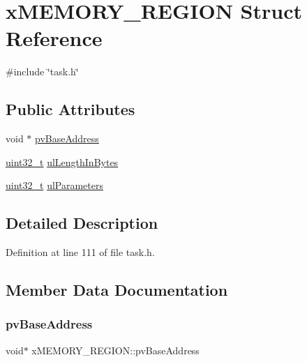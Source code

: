\hypertarget{structxMEMORY__REGION}{}\section{x\+M\+E\+M\+O\+R\+Y\+\_\+\+R\+E\+G\+I\+ON Struct Reference}
\label{structxMEMORY__REGION}


{\ttfamily \#include \char`\"{}task.\+h\char`\"{}}

\subsection*{Public Attributes}
\begin{DoxyCompactItemize}
\item 
void $\ast$ \hyperlink{structxMEMORY__REGION_a228036bbfdbc38f170e45deadb166172}{pv\+Base\+Address}
\item 
\hyperlink{stdint_8h_a435d1572bf3f880d55459d9805097f62}{uint32\+\_\+t} \hyperlink{structxMEMORY__REGION_a97e59578d3c4c46270d33e7206258a65}{ul\+Length\+In\+Bytes}
\item 
\hyperlink{stdint_8h_a435d1572bf3f880d55459d9805097f62}{uint32\+\_\+t} \hyperlink{structxMEMORY__REGION_a6ba180553e9a318f23acc5f4664934e3}{ul\+Parameters}
\end{DoxyCompactItemize}


\subsection{Detailed Description}


Definition at line 111 of file task.\+h.



\subsection{Member Data Documentation}
\mbox{\label{structxMEMORY__REGION_a228036bbfdbc38f170e45deadb166172}} 
\subsubsection{\texorpdfstring{pv\+Base\+Address}{pvBaseAddress}}
{\footnotesize\ttfamily void$\ast$ x\+M\+E\+M\+O\+R\+Y\+\_\+\+R\+E\+G\+I\+O\+N\+::pv\+Base\+Address}



